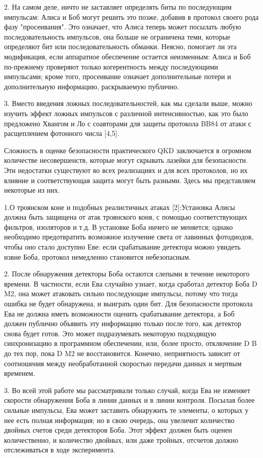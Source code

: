 2. На самом деле, ничто не заставляет определять биты по последующим импульсам: Алиса и Боб могут решить это позже, добавив в протокол своего рода фазу "просеивания". Это означает, что Алиса теперь может посылать любую последовательность импульсов, она больше не ограничена теми, которые определяют бит или последовательность обманки. Неясно, помогает ли эта модификация, если аппаратное обеспечение остается неизменным: Алиса и Боб по-прежнему проверяют только когерентность между последующими импульсами; кроме того, просеивание означает дополнительные потери и дополнительную информацию, раскрываемую публично.

3. Вместо введения ложных последовательностей, как мы сделали выше, можно изучить эффект ложных импульсов с различной интенсивностью, как это было предложено Хвангом и Ло с соавторами для защиты протокола BB84 от атаки с расщеплением фотонного числа [4,5].

Сложность в оценке безопасности практического QKD заключается в огромном количестве несовершенств, которые могут скрывать лазейки для безопасности. Эти недостатки существуют во всех реализациях и для всех протоколов, но их влияние и соответствующая защита могут быть разными. Здесь мы представляем некоторые из них.

1.О троянском коне и подобных реалистичных атаках [2]:Установка Алисы должна быть защищена от атак троянского коня, с помощью соответствующих фильтров, изоляторов и т.д. В установке Боба ничего не меняется; однако необходимо предотвратить возможное излучение света от лавинных фотодиодов, чтобы оно стало доступно Еве: если срабатывание детектора можно увидеть извне Боба, протокол немедленно становится небезопасным.

2. После обнаружения детекторы Боба остаются слепыми в течение некоторого времени. В частности, если Ева случайно узнает, когда сработал детектор Боба D M2, она может атаковать сильно последующие импульсы, потому что тогда ошибка не будет обнаружена, и выиграть один бит. Для безопасности протокола Ева не должна иметь возможности оценить срабатывание детектора, а Боб должен публично объявить эту информацию только после того, как детектор снова будет готов. Это может подразумевать некоторую подходящую синхронизацию в программном обеспечении, или, более просто, отключение D B до тех пор, пока D M2 не восстановится. Конечно, неприятность зависит от соотношения между необработанной скоростью передачи данных и мертвым временем.


3. Во всей этой работе мы рассматривали только случай, когда Ева не изменяет скорости обнаружения Боба в линии данных и в линии контроля. Посылая более сильные импульсы, Ева может заставить обнаружить те элементы, о которых у нее есть полная информация; но в свою очередь, она увеличит количество двойных счетов среди детекторов Боба. Этот эффект должен быть оценен количественно, и количество двойных, или даже тройных, отсчетов должно отслеживаться в ходе эксперимента.

